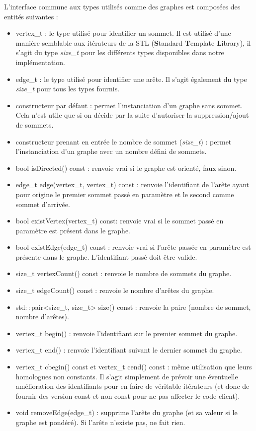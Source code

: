 \documentclass[12pt]{article}
\begin{document}
 \clearpage
 
 L'interface commune aux types utilisés comme des graphes est composées des entités suivantes : \\ \begin{itemize}
\item vertex\_t : le type utilisé pour identifier un sommet. Il est utilisé d'une manière semblable aux itérateurs de la STL ({\bf S}tandard {\bf T}emplate {\bf L}ibrary), il s'agit du type {\it size\_t} pour les différents types disponibles dans notre implémentation.
\item edge\_t : le type utilisé pour identifier une arête. Il s'agit également du type {\it size\_t} pour tous les types fournis.
\item constructeur par défaut : permet l'instanciation d'un graphe sans sommet. Cela n'est utile que si on décide par la suite d'autoriser la suppression/ajout de sommets.
\item constructeur prenant en entrée le nombre de sommet ({\it size\_t}) : permet l'instanciation d'un graphe avec un nombre défini de sommets.
\item bool isDirected() const : renvoie vrai si le graphe est orienté, faux sinon.
\item edge\_t edge(vertex\_t, vertex\_t) const : renvoie l'identifiant de l'arête ayant pour origine le premier sommet passé en paramètre et le second comme sommet d'arrivée.
\item bool existVertex(vertex\_t) const: renvoie vrai si le sommet passé en paramètre est présent dans le graphe.
\item bool existEdge(edge\_t) const : renvoie vrai si l'arête passée en paramètre est présente dans le graphe. L'identifiant passé doit être valide.
\item size\_t vertexCount() const : renvoie le nombre de sommets du graphe.
\item size\_t edgeCount() const : renvoie le nombre d'arêtes du graphe.
\item std$::$pair<size\_t, size\_t> size()  const : renvoie la paire (nombre de sommet, nombre d'arêtes).
\item vertex\_t begin() : renvoie l'identifiant sur le premier sommet du graphe.
\item vertex\_t end() : renvoie l'identifiant suivant le dernier sommet du graphe.
\item vertex\_t cbegin() const et vertex\_t cend() const : même utilisation que leurs homologues non constants. Il s'agit simplement de prévoir une éventuelle amélioration des identifiants pour en faire de véritable itérateurs (et donc de fournir des version const et non-const pour ne pas affecter le code client).
\item void removeEdge(edge\_t) : supprime l'arête du graphe (et sa valeur si le graphe est pondéré). Si l'arête n'existe pas, ne fait rien. \\
\end{itemize}
\end{document}
